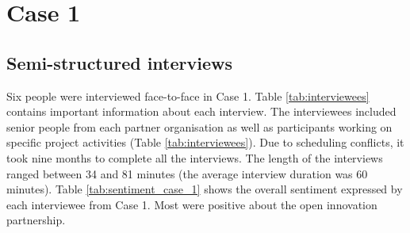 \begin{table}[p]
\bigskip
\begin{subtable}{1\textwidth}
\centering
{}%
\bigskip
\caption{Case 3}
\label{tab:sentiment_case_3}
\end{subtable}
\end{table}

\section{Case 1}

\subsection{Semi-structured interviews}

Six people were interviewed face-to-face in Case 1. Table \ref{tab:interviewees} contains important information about each interview. The interviewees included senior people from each partner organisation as well as participants working on specific project activities (Table \ref{tab:interviewees}). Due to scheduling conflicts, it took nine months to complete all the interviews. The length of the interviews ranged between 34 and 81 minutes (the average interview duration was 60 minutes). Table \ref{tab:sentiment_case_1} shows the overall sentiment expressed by each interviewee from Case 1. Most were positive about the open innovation partnership.

